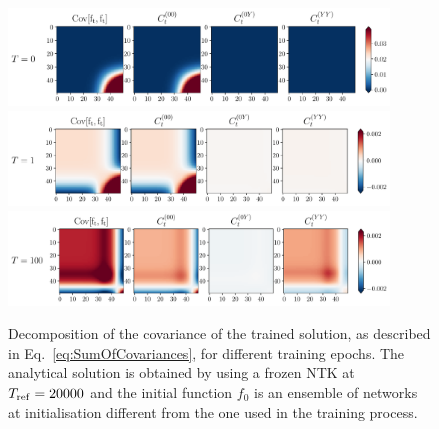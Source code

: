\begin{figure}[ht!]
  \centering
  \includegraphics[width=0.90\textwidth]{plots/analytical_solution/covariance_ft_0_L0.pdf}
  \includegraphics[width=0.90\textwidth]{plots/analytical_solution/covariance_ft_1_L0.pdf}
  \includegraphics[width=0.90\textwidth]{plots/analytical_solution/covariance_ft_100_L0.pdf}
  \caption{Decomposition of the covariance of the trained solution, as
  described in Eq.~\eqref{eq:SumOfCovariances}, for different training epochs.
  The analytical solution is obtained by using a frozen NTK at
  $T_{\rm{ref}}=20000$ and the initial function $f_0$ is an ensemble of
  networks at initialisation different from the one used in the training
  process.}
  \label{fig:analytical_covariance_L0}
\end{figure}
